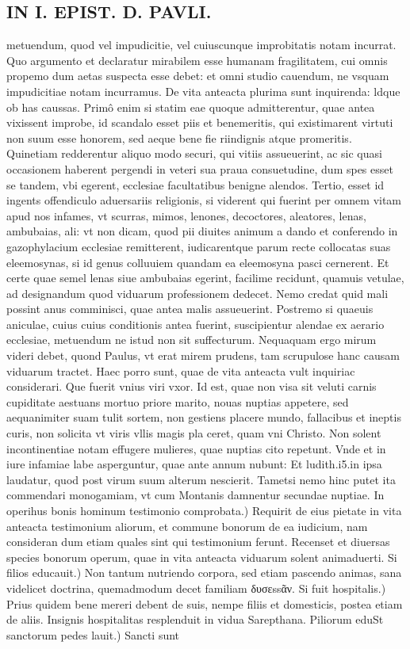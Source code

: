 \documentclass{article}
\begin{document}
\begin{pages}
\section*{IN I. EPIST. D. PAVLI. }
\marginpar{[ p.109 ]}\pstart metuendum, quod vel impudicitie, vel cuiuscunque improbitatis notam incurrat. Quo argumento et declaratur mirabilem esse humanam fragilitatem, cui omnis propemo dum aetas suspecta esse debet: et omni studio cauendum, ne vsquam impudicitiae notam incurramus. De vita anteacta plurima sunt inquirenda: ldque ob has caussas. Primô enim si statim eae quoque admitterentur, quae antea vixissent improbe, id scandalo esset piis et benemeritis, qui existimarent virtuti non suum esse honorem, sed aeque bene fie riindignis atque promeritis. Quinetiam redderentur aliquo modo securi, qui vitiis assueuerint, ac sic quasi occasionem haberent pergendi in veteri sua praua consuetudine, dum spes esset se tandem, vbi egerent, ecclesiae facultatibus benigne alendos. Tertio, esset id ingents offendiculo aduersariis religionis, si viderent qui fuerint per omnem vitam apud nos infames, vt scurras, mimos, lenones, decoctores, aleatores, lenas, ambubaias, ali: vt non dicam, quod pii diuites animum a dando et conferendo in gazophylacium ecclesiae remitterent, iudicarentque parum recte collocatas suas eleemosynas, si id genus colluuiem quandam ea eleemosyna pasci cernerent. Et certe quae semel lenas siue ambubaias egerint, facilime recidunt, quamuis vetulae, ad designandum quod viduarum professionem dedecet. Nemo credat quid mali possint anus comminisci, quae antea malis assueuerint. Postremo si quaeuis aniculae, cuius cuius conditionis antea fuerint, suscipientur alendae ex aerario ecclesiae, metuendum ne istud non sit suffecturum. Nequaquam ergo mirum videri debet, quond Paulus, vt erat mirem prudens, tam scrupulose hanc causam viduarum tractet. Haec porro sunt, quae de vita anteacta vult inquiriac considerari.  \pend\pstart Que fuerit vnius viri vxor. Id est, quae non visa sit veluti carnis cupiditate aestuans mortuo priore marito, nouas nuptias appetere, sed aequanimiter suam tulit sortem, non gestiens placere mundo, fallacibus et ineptis curis, non solicita vt viris vllis magis pla ceret, quam vni Christo. Non solent incontinentiae notam effugere mulieres, quae nuptias cito repetunt. Vnde et in iure infamiae labe asperguntur, quae ante annum nubunt: Et ludith.i5.in ipsa laudatur, quod post virum suum alterum nescierit. Tametsi nemo hinc putet ita commendari monogamiam, vt cum Montanis damnentur secundae nuptiae.  \pend\pstart In operihus bonis hominum testimonio comprobata.) Requirit de eius pietate in vita anteacta testimonium aliorum, et commune bonorum de ea iudicium, nam consideran dum etiam quales sint qui testimonium ferunt. Recenset et diuersas species bonorum operum, quae in vita anteacta viduarum solent animaduerti.  \pend\pstart Si filios educauit.) Non tantum nutriendo corpora, sed etiam pascendo animas, sana videlicet doctrina, quemadmodum decet familiam δυσεssᾶν.  \pend\pstart Si fuit hospitalis.) Prius quidem bene mereri debent de suis, nempe filiis et domesticis, postea etiam de aliis. Insignis hospitalitas resplenduit in vidua Sarepthana.  \pend\pstart Piliorum eduSt sanctorum pedes lauit.) Sancti sunt 
\end{pages}
\end{document}
